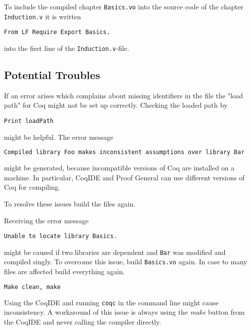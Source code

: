 To include the compiled chapter \texttt{Basics.vo} into the source code of the chapter \texttt{Induction.v} it is written
\begin{lstlisting}
From LF Require Export Basics.
\end{lstlisting}
into the first line of the \texttt{Induction.v}-file.

 

\subsection{Potential Troubles}

If an error arises which complains about missing identifiers in the file the "load path" for Coq might not be set up correctly.
Checking the loaded path by
\begin{lstlisting}
Print loadPath  
\end{lstlisting} 
might be helpful. The error message
\begin{lstlisting}[language = bash]
  Compiled library Foo makes inconsistent assumptions over library Bar
\end{lstlisting}
might be generated, because incompatible versions of Coq are installed on a machine.
In particular,  CoqIDE and Proof General can use different versions of Coq for compiling. 

To resolve these issues build the files again.

Receiving the error message 
\begin{lstlisting}
Unable to locate library Basics.
\end{lstlisting}
might be caused if two libraries are dependent and \texttt{Bar} was modified and compiled singly.
To overcome this issue, build \texttt{Basics.vo} again.
In case to many files are affected build everything again.
\begin{lstlisting}[language=bash]
Make clean, make
\end{lstlisting}

Using the CoqIDE and running \texttt{coqc} in the command line might cause inconsistency. 
A workaround of this issue is always using the {\itshape make} button from the CoqIDE and never calling the compiler directly.
